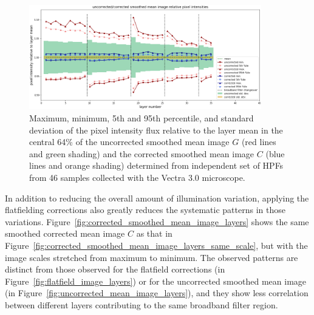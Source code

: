 \documentclass[letterpaper,11pt]{article}
\newcommand{\reffig}[1]{Figure~\ref{#1}}
\begin{document}
\begin{figure}[!ht]
\centering
\includegraphics[width=0.90\textwidth]{images/results/illumination_variation_reduction}
\caption{\footnotesize Maximum, minimum, 5th and 95th percentile, and standard deviation of the pixel intensity flux relative to the layer mean in the central 64\% of the uncorrected smoothed mean image $G$ (red lines and green shading) and the corrected smoothed mean image $C$ (blue lines and orange shading) determined from independent set of HPFs from 46 samples collected with the Vectra 3.0 microscope.}
\label{fig:illumination_variation_reduction}
\end{figure} 

In addition to reducing the overall amount of illumination variation, applying the flatfielding corrections also greatly reduces the systematic patterns in those variations. \reffig{fig:corrected_smoothed_mean_image_layers} shows the same smoothed corrected mean image $C$ as that in \reffig{fig:corrected_smoothed_mean_image_layers_same_scale}, but with the image scales stretched from maximum to minimum. The observed patterns are distinct from those observed for the flatfield corrections (in \reffig{fig:flatfield_image_layers}) or for the uncorrected smoothed mean image (in \reffig{fig:uncorrected_mean_image_layers}), and they show less correlation between different layers contributing to the same broadband filter region.
\end{document}
